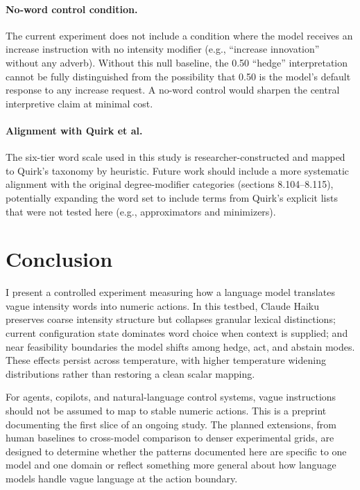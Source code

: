 \documentclass[11pt]{article}
\begin{document}
\paragraph{No-word control condition.}
The current experiment does not include a condition where the model receives an increase instruction with no intensity modifier (e.g., ``increase innovation'' without any adverb). Without this null baseline, the 0.50 ``hedge'' interpretation cannot be fully distinguished from the possibility that 0.50 is the model's default response to any increase request. A no-word control would sharpen the central interpretive claim at minimal cost.

\paragraph{Alignment with Quirk et al.}
The six-tier word scale used in this study is researcher-constructed and mapped to Quirk's taxonomy by heuristic. Future work should include a more systematic alignment with the original degree-modifier categories (sections 8.104--8.115), potentially expanding the word set to include terms from Quirk's explicit lists that were not tested here (e.g., approximators and minimizers).

\section{Conclusion}

I present a controlled experiment measuring how a language model translates vague intensity words into numeric actions. In this testbed, Claude Haiku preserves coarse intensity structure but collapses granular lexical distinctions; current configuration state dominates word choice when context is supplied; and near feasibility boundaries the model shifts among hedge, act, and abstain modes. These effects persist across temperature, with higher temperature widening distributions rather than restoring a clean scalar mapping.

For agents, copilots, and natural-language control systems, vague instructions should not be assumed to map to stable numeric actions. This is a preprint documenting the first slice of an ongoing study. The planned extensions, from human baselines to cross-model comparison to denser experimental grids, are designed to determine whether the patterns documented here are specific to one model and one domain or reflect something more general about how language models handle vague language at the action boundary.



\end{document}
